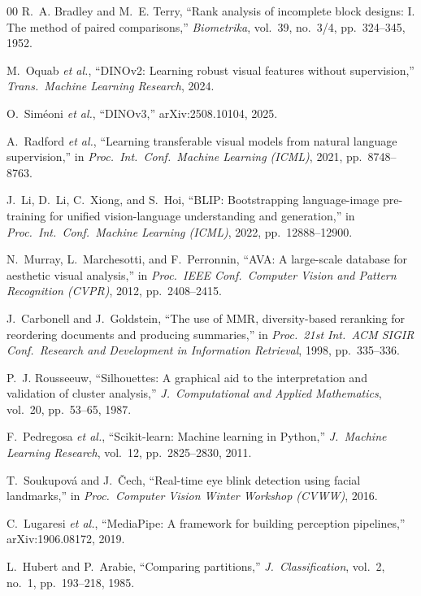 \documentclass[conference]{IEEEtran}
\begin{document}
\begin{thebibliography}{00}
R.~A. Bradley and M.~E. Terry,
``Rank analysis of incomplete block designs: I. The method of paired comparisons,''
\emph{Biometrika}, vol.~39, no.~3/4, pp.~324--345, 1952.

M.~Oquab \emph{et al.},
``DINOv2: Learning robust visual features without supervision,''
\emph{Trans.\ Machine Learning Research}, 2024.

O.~Sim\'eoni \emph{et al.},
``\mbox{DINOv3},''
arXiv:2508.10104, 2025.

A.~Radford \emph{et al.},
``Learning transferable visual models from natural language supervision,''
in \emph{Proc.\ Int.\ Conf.\ Machine Learning (ICML)}, 2021, pp.~8748--8763.

J.~Li, D.~Li, C.~Xiong, and S.~Hoi,
``BLIP: Bootstrapping language-image pre-training for unified vision-language understanding and generation,''
in \emph{Proc.\ Int.\ Conf.\ Machine Learning (ICML)}, 2022, pp.~12888--12900.

N.~Murray, L.~Marchesotti, and F.~Perronnin,
``AVA: A large-scale database for aesthetic visual analysis,''
in \emph{Proc.\ IEEE Conf.\ Computer Vision and Pattern Recognition (CVPR)},
2012, pp.~2408--2415.

J.~Carbonell and J.~Goldstein,
``The use of MMR, diversity-based reranking for reordering documents and producing summaries,''
in \emph{Proc.\ 21st Int.\ ACM SIGIR Conf.\ Research and Development in Information Retrieval},
1998, pp.~335--336.

P.~J. Rousseeuw,
``Silhouettes: A graphical aid to the interpretation and validation of cluster analysis,''
\emph{J.\ Computational and Applied Mathematics}, vol.~20, pp.~53--65, 1987.

F.~Pedregosa \emph{et al.},
``Scikit-learn: Machine learning in Python,''
\emph{J.\ Machine Learning Research}, vol.~12, pp.~2825--2830, 2011.

T.~Soukupov\'a and J.~\v{C}ech,
``Real-time eye blink detection using facial landmarks,''
in \emph{Proc.\ Computer Vision Winter Workshop (CVWW)}, 2016.

C.~Lugaresi \emph{et al.},
``MediaPipe: A framework for building perception pipelines,''
arXiv:1906.08172, 2019.

L.~Hubert and P.~Arabie,
``Comparing partitions,''
\emph{J.\ Classification}, vol.~2, no.~1, pp.~193--218, 1985.

\end{thebibliography}
\end{document}
